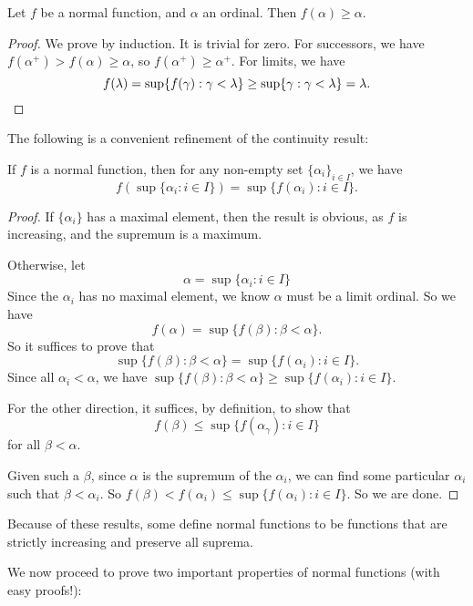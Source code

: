 \documentclass[a4paper]{article}
\begin{document}
\begin{own}
  \begin{lemma}
    Let $f$ be a normal function, and $\alpha$ an ordinal. Then $f(\alpha) \geq \alpha$.
  \end{lemma}

  \begin{proof}
    We prove by induction. It is trivial for zero. For successors, we have $f(\alpha^+) > f(\alpha) \geq \alpha$, so $f(\alpha^+) \geq \alpha^+$. For limits, we have
    \[
      f(\lambda) = \sup \{f(\gamma): \gamma < \lambda\} \geq \sup\{\gamma: \gamma < \lambda\} = \lambda.\qedhere
    \]
  \end{proof}

  The following is a convenient refinement of the continuity result:
  \begin{lemma}
    If $f$ is a normal function, then for any non-empty set $\{\alpha_i\}_{i \in I}$, we have
    \[
      f(\sup\{\alpha_i: i \in I\}) = \sup\{f(\alpha_i): i \in I\}.
    \]
  \end{lemma}

  \begin{proof}
    If $\{\alpha_i\}$ has a maximal element, then the result is obvious, as $f$ is increasing, and the supremum is a maximum.

    Otherwise, let
    \[
      \alpha = \sup\{\alpha_i: i \in I\}
    \]
    Since the $\alpha_i$ has no maximal element, we know $\alpha$ must be a limit ordinal. So we have
    \[
      f(\alpha) = \sup \{f(\beta): \beta < \alpha\}.
    \]
    So it suffices to prove that
    \[
      \sup \{f(\beta): \beta < \alpha\} = \sup\{f(\alpha_i): i \in I\}.
    \]
    Since all $\alpha_i < \alpha$, we have $\sup \{f(\beta): \beta < \alpha\} \geq \sup\{f(\alpha_i): i \in I\}$.

    For the other direction, it suffices, by definition, to show that
    \[
      f(\beta) \leq \sup \{f(\alpha_\gamma): i \in I\}
    \]
    for all $\beta < \alpha$.

    Given such a $\beta$, since $\alpha$ is the supremum of the $\alpha_i$, we can find some particular $\alpha_i$ such that $\beta < \alpha_i$. So $f(\beta) < f(\alpha_i) \leq \sup \{f(\alpha_i): i \in I\}$. So we are done.
  \end{proof}
  Because of these results, some define normal functions to be functions that are strictly increasing and preserve all suprema.

  We now proceed to prove two important properties of normal functions (with easy proofs!):


\end{own}
\end{document}
